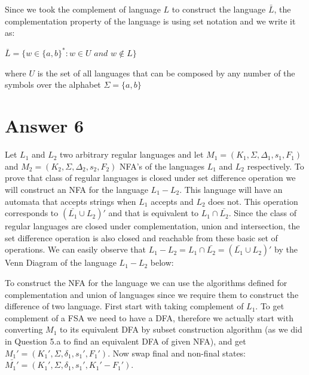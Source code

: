 \documentclass[12pt]{article}
\def\firstcircle{(0,0) circle (1.5cm)}
\def\secondcircle{(0:2cm) circle (1.5cm)}
\begin{document}
Since we took the complement of language $L$ to construct the language $\bar{L}$, the complementation property of the language is using set notation and we write it as:
\begin{center}
$\bar{L}=\{w\in \{a,b\}^*: w\in U$ $and$ $w\notin L\}$
\end{center}
where $U$ is the set of all languages that can be composed by any number of the symbols over the alphabet $\Sigma = \{a,b\}$

\newpage
\section*{Answer 6}
Let $L_1$ and $L_2$ two arbitrary regular languages and let $M_1=(K_1,\Sigma,\Delta_1,s_1,F_1)$ and $M_2=(K_2,\Sigma,\Delta_2,s_2,F_2)$ NFA's of the languages $L_1$ and $L_2$ respectively. To prove that class of regular languages is closed under set difference operation we will construct an NFA for the language $L_1-L_2$. This language will have an automata that accepts strings when $L_1$ accepts and $L_2$ does not. This operation corresponds to $(\bar{L_1} \cup L_2)'$ and that is equivalent to $L_1 \cap \bar{L_2}$. Since the class of regular languages are closed under complementation, union and intersection, the set difference operation is also closed and reachable from these basic set of operations. We can easily observe that $L_1-L_2 = L_1 \cap\bar{L_2}=(\bar{L_1} \cup L_2)'$ by the Venn Diagram of the language $L_1-L_2$ below:

\begin{center}
\end{center}

To construct the NFA for the language we can use the algorithms defined for complementation and union of languages since we require them to construct the difference of two language. First start with taking complement of $L_1$. To get complement of a FSA we need to have a DFA, therefore we actually start with converting $M_1$ to its equivalent DFA by subset construction algorithm (as we did in Question 5.a to find an equivalent DFA of given NFA), and get $M_1'=(K_1',\Sigma,\delta_1,s_1',F_1')$. Now swap final and non-final states: $\bar{M_1'}=(K_1',\Sigma,\delta_1,s_1',K_1'-F_1')$.\\
\end{document}
